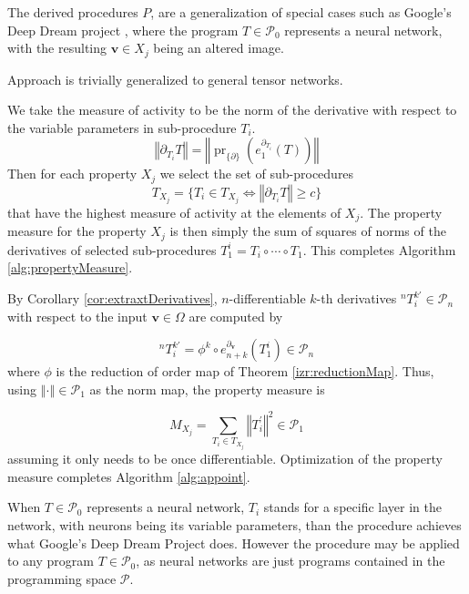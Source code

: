 \documentclass[smallcondensed]{svjour3}
\newcommand{\vv}{\mathbf{v}}
\newcommand{\dP}{\mathcal{P}}
\newcommand{\D}{\partial}
\DeclareMathOperator{\proj}{pr}
\begin{document}
   The derived procedures $P$, are a generalization of special cases such as Google's Deep Dream project \cite{DeepDream}, where the program $T\in\dP_0$ represents a neural network, with the resulting $\vv\in X_j$ being an altered image.
   
   \begin{remark}
      Approach is trivially generalized to general tensor networks.
      \end{remark}
   
   We take the measure of activity to be the norm of the derivative with respect to the variable parameters in sub-procedure $T_i$.
   $$\left\Vert\D_{T_i}T\right\Vert=\left\Vert \proj_{\{\D\}}\left(e^{\D_{T_i}}_1(T)\right)\right\Vert$$
   Then for each property $X_j$ we select the set of sub-procedures 
   $$T_{X_j}=\{T_i\in T_{X_j}\iff \left\Vert\D_{T_i}T\right\Vert\ge c\}$$
   that have the highest measure of activity at the elements of $X_j$. The property measure for the property $X_j$ is then simply the sum of squares of norms of the derivatives of selected sub-procedures $T^i_1=T_i\circ\cdots\circ T_1$. This completes Algorithm \ref{alg:propertyMeasure}. 
   
   By Corollary \ref{cor:extraxtDerivatives}, $n$-differentiable $k$-th derivatives $^{n}T^{k\prime}_i\in\dP_n$ with respect to the input $\vv\in\Omega$ are computed by
   
   \begin{equation}
   ^{n}T^{k\prime}_i=\phi^k\circ e^{\D_\vv}_{n+k}(T^i_1)\in\dP_n
   \end{equation}
   where $\phi$ is the reduction of order map of Theorem \ref{izr:reductionMap}.
   Thus, using $\left\Vert\cdot\right\Vert\in\dP_1$ as the norm map, the property measure is
   
   \begin{equation}
   M_{X_j}=\sum\limits_{T_i\in T_{X_j}} \left\Vert T^\prime_i\right\Vert^2\in\dP_1
   \end{equation}
   assuming it only needs to be once differentiable. Optimization of the property measure completes Algorithm \ref{alg:appoint}.
   
   When $T\in\dP_0$ represents a neural network, $T_i$ stands for a specific layer in the network, with neurons being its variable parameters, than the procedure achieves what Google's Deep Dream Project \cite{DeepDream} does. However the procedure may be applied to any program $T\in\dP_0$, as neural networks are just programs contained in the programming space $\dP$.
   
\end{document}
